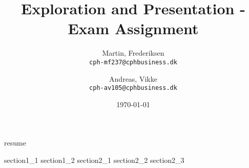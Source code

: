 \documentclass[10pt]{article}
\title{Exploration and Presentation - Exam Assignment}
\author{
    Martin, Frederiksen\\
    \texttt{cph-mf237@cphbusiness.dk}\\
    \and
    Andreas, Vikke\\
    \texttt{cph-av105@cphbusiness.dk}
  }
\date{\today}
\begin{document}
\hypersetup{pageanchor=false}
\maketitle
{resume}
\tableofcontents

\newpage
{section1_1}
{section1_2}
{section2_1}
\newpage
{section2_2}
{section2_3}

\newpage


\end{document}
